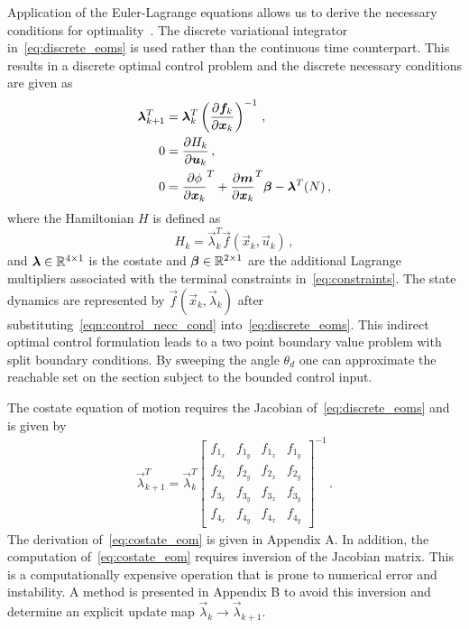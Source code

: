 \documentclass[preprint]{elsarticle}
\begin{document}
Application of the Euler-Lagrange equations allows us to derive the necessary conditions for optimality~\cite{bryson1975}.
The discrete variational integrator in~\cref{eq:discrete_eoms} is used rather than the continuous time counterpart. 
This results in a discrete optimal control problem and the discrete necessary conditions are given as
\begin{subequations}\label{eq:necc_cond}
\begin{align}
	\boldsymbol{\lambda}_{k+1}^T &= \boldsymbol{\lambda}_k^T  \left( \frac{\partial \boldsymbol{f}_k}{\partial \boldsymbol{x}_k} \right)^{-1} \, , \\
	0 &=  \frac{\partial H_k}{\partial \boldsymbol{u}_k} \, , \label{eqn:control_necc_cond}\\
	0 &= \frac{\partial \phi}{\partial \boldsymbol{x}_k}^T + \frac{\partial \boldsymbol{m}}{\partial \boldsymbol{x}_k}^T \boldsymbol{\beta}  - \boldsymbol{\lambda}^T(N) \, ,  
\end{align}
\end{subequations}
where the Hamiltonian \(H\) is defined as
\begin{equation}
	H_k = \vec{\lambda}_k^T \vec{f}(\vec{x}_k, \vec{u}_k) \, ,
	\label{eq:hamiltonian_opt}
\end{equation}
and \( \boldsymbol{\lambda} \in \mathbb{R}^{4 \times 1} \) is the costate and \(\boldsymbol{\beta} \in \mathbb{R}^{2 \times 1} \) are the additional Lagrange multipliers associated with the terminal constraints in~\cref{eq:constraints}.
The state dynamics are represented by \( \vec{f}(\vec{x}_k, \vec{\lambda}_k ) \) after substituting~\cref{eqn:control_necc_cond} into~\cref{eq:discrete_eoms}.
This indirect optimal control formulation leads to a two point boundary value problem with split boundary conditions. 
By sweeping the angle \( \theta_d \) one can approximate the reachable set on the \Poincare section subject to the bounded control input. 

The costate equation of motion requires the Jacobian of~\cref{eq:discrete_eoms} and is given by
\begin{align}\label{eq:costate_eom}
	\vec{\lambda}_{k+1}^T = \vec{\lambda}_k^T
	\begin{bmatrix} 
		f_{1_x} & f_{1_y} & f_{1_{\dot{x}}} & f_{1_{\dot{y}}} \\
		f_{2_x} & f_{2_y} & f_{2_{\dot{x}}} & f_{2_{\dot{y}}} \\
		f_{3_x} & f_{3_y} & f_{3_{\dot{x}}} & f_{3_{\dot{y}}} \\
		f_{4_x} & f_{4_y} & f_{4_{\dot{x}}} & f_{4_{\dot{y}}}
	\end{bmatrix} ^ {-1} \, .
\end{align}
The derivation of~\cref{eq:costate_eom} is given in Appendix A.
In addition, the computation of~\cref{eq:costate_eom} requires inversion of the Jacobian matrix.
This is a computationally expensive operation that is prone to numerical error and instability.
A method is presented in Appendix B to avoid this inversion and determine an explicit update map \( \vec{\lambda}_k \to \vec{\lambda}_{k+1} \).
\end{document}
